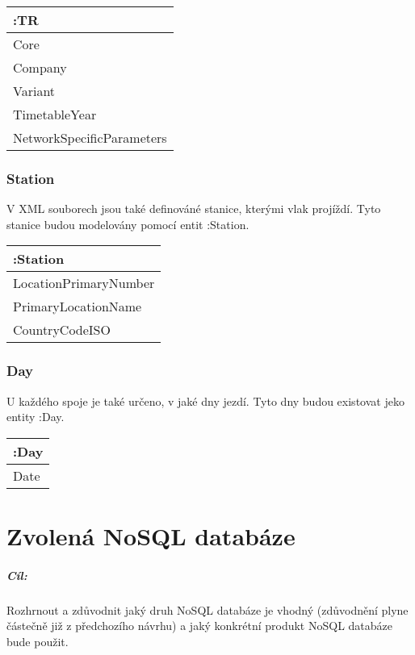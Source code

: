 \documentclass[10pt,xcolor=pdflatex,dvipsnames,table,oneside]{book}
\begin{document}
\vspace{1em}
\begin{tabular}{|l|}
    \hline
    :TR \\
    \hline
    Core \\
    Company \\
    Variant \\
    TimetableYear \\
    NetworkSpecificParameters \\
    \hline
\end{tabular}

\subsection{Station}
V XML souborech jsou také definováné stanice, kterými vlak projíždí. Tyto stanice budou modelovány pomocí
entit :Station.

\vspace{1em}
\begin{tabular}{|l|}
    \hline
    :Station \\
    \hline
    LocationPrimaryNumber \\
    PrimaryLocationName \\
    CountryCodeISO \\
    \hline
\end{tabular}

\subsection{Day}
U každého spoje je také určeno, v jaké dny jezdí. Tyto dny budou existovat jeko entity :Day.

\vspace{1em}
\begin{tabular}{|l|}
    \hline
    :Day \\
    \hline
    Date \\
    \hline
\end{tabular}

\chapter{Zvolená NoSQL databáze}

\paragraph{Cíl:}
Rozhrnout a zdůvodnit jaký druh NoSQL databáze je vhodný (zdůvodnění plyne částečně již z předchozího návrhu) a jaký konkrétní produkt NoSQL databáze bude použit.
\end{document}
